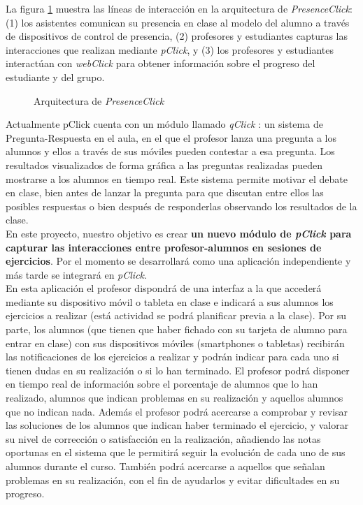 La figura \ref{fig:presenceclick-architecture} muestra las líneas de interacción en la arquitectura de \textit{PresenceClick}: (1) los asistentes comunican su presencia en clase al modelo del alumno a través de dispositivos de control de presencia, (2) profesores y estudiantes capturas las interacciones que realizan mediante \textit{pClick}, y (3) los profesores y estudiantes interactúan con \textit{webClick} para obtener información sobre el progreso del estudiante y del grupo.\\

\noindent
\begin{figure}[!htbp]
\noindent
{}
\caption{Arquitectura de \textit{PresenceClick}}
\label{fig:presenceclick-architecture}
\end{figure}

Actualmente pClick cuenta con un módulo llamado \textit{qClick} \cite{qclick}: un sistema de Pregunta-Respuesta en el aula, en el que el profesor lanza una pregunta a los alumnos y ellos a través de sus móviles pueden contestar a esa pregunta. Los resultados visualizados de forma gráfica a las preguntas realizadas pueden mostrarse a los alumnos en tiempo real. Este sistema permite motivar el debate en clase, bien antes de lanzar la pregunta para que discutan entre ellos las posibles respuestas o bien después de responderlas observando los resultados de la clase.\\

En este proyecto, nuestro objetivo es crear \textbf{un nuevo módulo de \textit{pClick} para capturar las interacciones entre profesor-alumnos en sesiones de ejercicios}. Por el momento se desarrollará como una aplicación independiente y más tarde se integrará en \textit{pClick}.\\

En esta aplicación el profesor dispondrá de una interfaz a la que accederá mediante su dispositivo móvil o tableta en clase e indicará a sus alumnos los ejercicios a realizar (está actividad se podrá planificar previa a la clase). Por su parte, los alumnos (que tienen que haber fichado con su tarjeta de alumno para entrar en clase) con sus dispositivos móviles (smartphones o tabletas) recibirán las notificaciones de los ejercicios a realizar y podrán indicar para cada uno si tienen dudas en su realización o si lo han terminado. El profesor podrá disponer en tiempo real de información sobre el porcentaje de alumnos que lo han realizado, alumnos que indican problemas en su realización y aquellos alumnos que no indican nada. Además el profesor podrá acercarse a comprobar y revisar las soluciones de los alumnos que indican haber terminado el ejercicio, y valorar su nivel de corrección o satisfacción en la realización, añadiendo las notas oportunas en el sistema que le permitirá seguir la evolución de cada uno de sus alumnos durante el curso. También podrá acercarse a aquellos que señalan problemas en su realización, con el fin de ayudarlos y evitar dificultades en su progreso.\\


